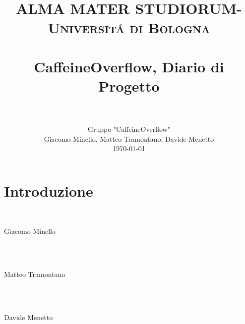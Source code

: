 \documentclass[paper=a4, fontsize=11pt]{scrartcl}
\title{
		\usefont{OT1}{bch}{b}{n}
		\normalfont \normalsize \textsc{ALMA MATER STUDIORUM- Universit\'a di Bologna} \\ [25pt]
		\horrule{0.5pt} \\[0.4cm]
		\huge CaffeineOverflow, Diario di Progetto \\
		\horrule{2pt} \\[0.5cm]
}
\author{Gruppo "CaffeineOverflow"\\
		\normalfont 								\normalsize
        Giacomo Minello, Matteo Tramontano, Davide Menetto\\[-3pt]		\normalsize
        \today
}
\date{}
\numberwithin{equation}{section}		%
\numberwithin{figure}{section}			%
\numberwithin{table}{section}				%
\begin{document}
\maketitle
\section{Introduzione}

\\
\begin{flushright}
Giacomo Minello
\end{flushright}
\\~\\
\begin{flushright}
Matteo Tramontano
\end{flushright}
\\~\\
\begin{flushright}
Davide Menetto
\end{flushright}
\end{document}
